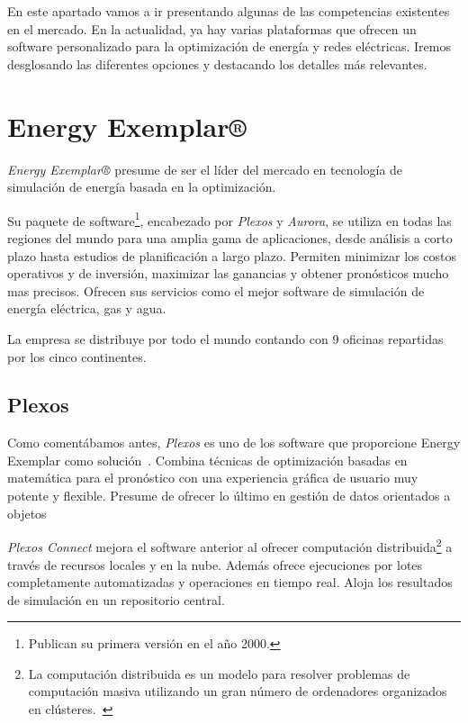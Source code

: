 
En este apartado vamos a ir presentando algunas de las competencias existentes en el mercado. En la actualidad, ya hay varias plataformas que ofrecen un software personalizado para la optimización de energía y redes eléctricas. Iremos desglosando las diferentes opciones y destacando los detalles más relevantes.

\section{Energy Exemplar®}

\textit{Energy Exemplar®} presume de ser el líder del mercado en tecnología de simulación de energía basada en la optimización. 

Su paquete de software\footnote{Publican su primera versión en el año 2000.}, encabezado por \textit{Plexos} y \textit{Aurora}, se utiliza en todas las regiones del mundo para una amplia gama de aplicaciones, desde análisis a corto plazo hasta estudios de planificación a largo plazo. Permiten minimizar los costos operativos y de inversión, maximizar las ganancias y obtener pronósticos mucho mas precisos. Ofrecen sus servicios como el mejor software de simulación de energía eléctrica, gas y agua.  

La empresa se distribuye por todo el mundo contando con 9 oficinas repartidas por los cinco continentes.

\subsection{Plexos}

Como comentábamos antes, \textit{Plexos} es uno de los software que proporcione Energy Exemplar como solución~\cite{web:EnergyExemplarPlexos}. Combina técnicas de optimización basadas en matemática para el pronóstico con una experiencia gráfica de usuario muy potente y flexible. Presume de ofrecer lo último en gestión de datos orientados a objetos

\textit{Plexos Connect} mejora el software anterior al ofrecer computación distribuida\footnote{La computación distribuida es un modelo para resolver problemas de computación masiva utilizando un gran número de ordenadores organizados en clústeres.~\cite{web:computacionDistribuida}} a través de recursos locales y en la nube. Además ofrece ejecuciones por lotes completamente automatizadas y operaciones en tiempo real. Aloja los resultados de simulación en un repositorio central.

